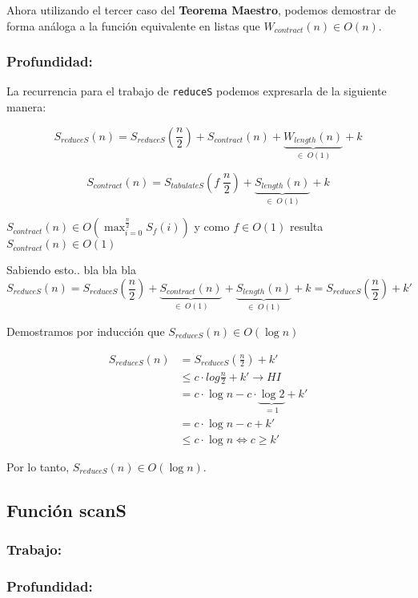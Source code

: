 \documentclass[11pt]{article}
\begin{document}
Ahora utilizando el tercer caso del \textbf{Teorema Maestro}, podemos 
demostrar de forma análoga a la función equivalente en listas que
$W_{contract}(n) \in O(n)$.

\subsubsection{Profundidad:}

La recurrencia para el trabajo de \texttt{reduceS} podemos expresarla de la siguiente manera:

\begin{equation*}
    S_{reduceS}(n) =  S_{reduceS}(\frac{n}{2}) + S_{contract}(n) + \underbrace{W_{length}(n)}_{\in \; O(1)} + k
\end{equation*}

\begin{equation*}
    S_{contract}(n) = S_{tabulateS}(f \; \frac{n}{2}) + \underbrace{S_{length}(n)}_{\in \; O(1)} + k
\end{equation*}

$S_{contract}(n) \in O\left(\displaystyle\max_{i=0}^{\frac{n}{2}}S_f(i)\right) $
y como $f\in O(1)$ resulta $S_{contract}(n) \in O(1)$

Sabiendo esto.. bla bla bla
\begin{equation*}
    S_{reduceS}(n) =  S_{reduceS}(\frac{n}{2}) +  \underbrace{S_{contract}(n) }_{\in \; O(1)} +
    \underbrace{S_{length}(n)}_{\in \; O(1)} + k =  S_{reduceS}(\frac{n}{2}) + k'
\end{equation*}

Demostramos por inducción que $S_{reduceS}(n) \in O(\log{n})$

\begin{align*}
    S_{reduceS}(n) & = S_{reduceS}(\frac{n}{2}) + k' \\
                   & \leq c \cdot log{\frac{n}{2}} + k' \rightarrow HI\\
                   & = c \cdot \log{n} - c \cdot \underbrace{\log{2}}_{= 1} + k' \\
                   & = c \cdot \log{n} - c + k' \\
                   & \leq c \cdot \log{n} \iff c \geq k'
\end{align*}

Por lo tanto, $S_{reduceS}(n) \in O(\log{n})$.


\subsection{Función scanS}
\subsubsection{Trabajo:}

\subsubsection{Profundidad:}
\end{document}

